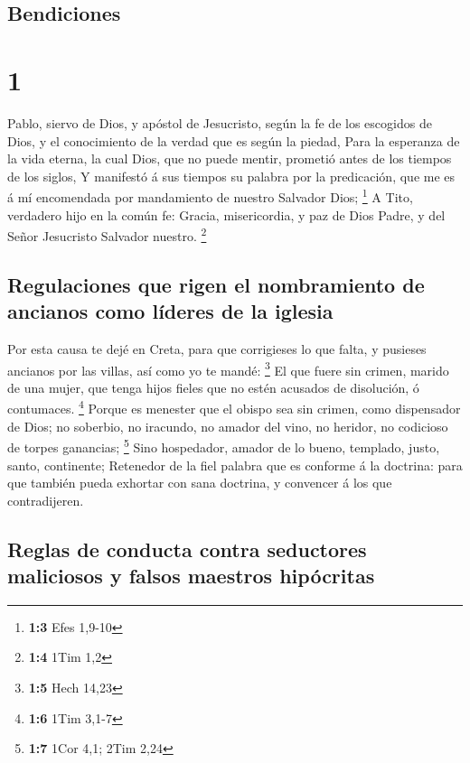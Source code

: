 \hypertarget{bendiciones}{%
\subsection{Bendiciones}\label{bendiciones}}

\hypertarget{section}{%
\section{1}\label{section}}

 Pablo, siervo de Dios, y apóstol de Jesucristo, según la fe
de los escogidos de Dios, y el conocimiento de la verdad que es según la
piedad,  Para la esperanza de la vida eterna, la cual Dios,
que no puede mentir, prometió antes de los tiempos de los siglos,
 Y manifestó á sus tiempos su palabra por la predicación,
que me es á mí encomendada por mandamiento de nuestro Salvador Dios;
\footnote{\textbf{1:3} Efes 1,9-10}  A Tito, verdadero hijo
en la común fe: Gracia, misericordia, y paz de Dios Padre, y del Señor
Jesucristo Salvador nuestro. \footnote{\textbf{1:4} 1Tim 1,2}

\hypertarget{regulaciones-que-rigen-el-nombramiento-de-ancianos-como-luxedderes-de-la-iglesia}{%
\subsection{Regulaciones que rigen el nombramiento de ancianos como
líderes de la
iglesia}\label{regulaciones-que-rigen-el-nombramiento-de-ancianos-como-luxedderes-de-la-iglesia}}

 Por esta causa te dejé en Creta, para que corrigieses lo
que falta, y pusieses ancianos por las villas, así como yo te mandé:
\footnote{\textbf{1:5} Hech 14,23}  El que fuere sin crimen,
marido de una mujer, que tenga hijos fieles que no estén acusados de
disolución, ó contumaces. \footnote{\textbf{1:6} 1Tim 3,1-7}
 Porque es menester que el obispo sea sin crimen, como
dispensador de Dios; no soberbio, no iracundo, no amador del vino, no
heridor, no codicioso de torpes ganancias; \footnote{\textbf{1:7} 1Cor
  4,1; 2Tim 2,24}  Sino hospedador, amador de lo bueno,
templado, justo, santo, continente;  Retenedor de la fiel
palabra que es conforme á la doctrina: para que también pueda exhortar
con sana doctrina, y convencer á los que contradijeren.

\hypertarget{reglas-de-conducta-contra-seductores-maliciosos-y-falsos-maestros-hipuxf3critas}{%
\subsection{Reglas de conducta contra seductores maliciosos y falsos
maestros
hipócritas}\label{reglas-de-conducta-contra-seductores-maliciosos-y-falsos-maestros-hipuxf3critas}}

